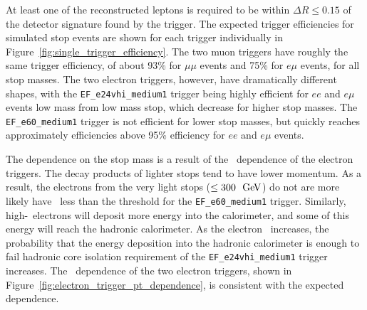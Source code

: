 At least one of the reconstructed leptons is required to be within 
$\Delta R \leq 0.15$ of the detector signature found by the trigger.
The expected trigger efficiencies for simulated stop events are shown
for each trigger individually in Figure~\ref{fig:single_trigger_efficiency}.
The two muon triggers have roughly the same trigger efficiency, of about 93\% 
for $\mu\mu$ events and 75\% for $e\mu$ events, for all stop masses.
The two electron triggers, however, have dramatically different shapes, with
the \texttt{EF\_e24vhi\_medium1} trigger being highly efficient for $ee$ and
$e\mu$ events low mass from low mass stop, which decrease for higher
stop masses. 
The \texttt{EF\_e60\_medium1} trigger is not efficient for lower stop
masses, but quickly reaches approximately efficiencies above 95\% efficiency for
$ee$ and $e\mu$ events.

The dependence on the stop mass is a result of the \ET\ dependence of the
electron triggers.
The decay products of lighter stops tend to have lower momentum.
As a result, the electrons from the very light stops ($\leq 300~\GeV$) do not 
are more likely have \ET\ less than the threshold for the
\texttt{EF\_e60\_medium1} trigger.
Similarly, high-\HT\ electrons will deposit more energy into the calorimeter,
and some of this energy will reach the hadronic calorimeter.
As the electron \HT\ increases, the probability that the energy deposition into
the hadronic calorimeter is enough to fail hadronic core isolation requirement
of the \texttt{EF\_e24vhi\_medium1} trigger increases.
The \ET\ dependence of the two electron triggers, shown in
Figure~\ref{fig:electron_trigger_pt_dependence}, is consistent with the expected
dependence.

